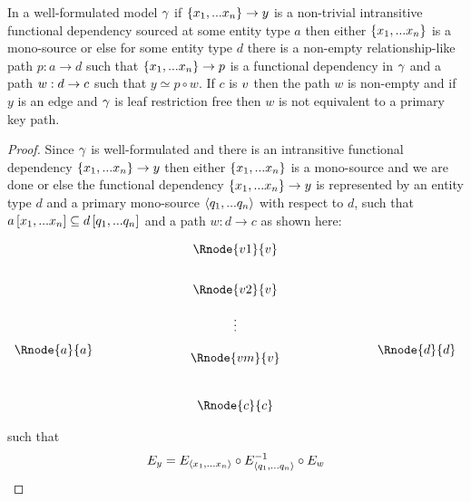 \begin{lemma}
In a well-formulated model $\gamma$  if $\left\{x_1,...x_n\right\} \rightarrow y$  is a non-trivial intransitive 
functional dependency sourced at some entity type $a$ then either $\left\{x_1,...x_n\right\}$ is a mono-source
or else for some entity type $d$ there is a non-empty relationship-like path $p:a \rightarrow d$ such that $\{x_1,...x_n\} \rightarrow p$ is a functional dependency in $\gamma$
and a  path $w:d \rightarrow c$  such that $y \simeq p \circ w$. If $c$ is $v$ then
the path $w$ is non-empty and if $y$ is an edge and $\gamma$ is leaf restriction free then $w$ is not equivalent to a primary key path.
\end{lemma}
\begin{proof}
Since $\gamma$ is well-formulated  and there is an intransitive functional dependency $\left\{x_1,...x_n\right\} \rightarrow y$ then either $\left\{x_1,...x_n\right\}$ is a mono-source and we are done or else the functional dependency
$\left\{x_1,...x_n\right\} \rightarrow y$   is represented 
by  an entity type $d$ and 
a primary mono-source $\langle q_1,...q_n\rangle$ with respect to
$d$, such that $a\left[x_1,...x_n\right]\subseteq d\left[q_1,...q_n\right]$ and a 
path $w:d\rightarrow c$ as shown here:

\setlength{\arraycolsep}{.2cm}
\begin{center}
$
\begin{array}{cp{2cm}c p{2cm} c}
             &  & \Rnode{v1}{\veee} & &               \\ [0.7cm]
						 &  & \Rnode{v2}{\veee} & &               \\ [0.4cm]
						 &  &     \vdots      & &               \\ [0.2cm]
\Rnode{a}{a} &  &                 & & \Rnode{d}{d}  \\ [-0.2cm]
             &  & \Rnode{vm}{\veee} & &               \\ [0.9cm]
             &  & \Rnode{c}{c}    & &               \\
\end{array}
$
\end{center}
such that
\begin{equation}
\label{fundependency}
E_y = E_{\langle x_1,...x_n\rangle} \circ E_{\langle q_1,...q_n\rangle}^{-1} \circ E_w
\end{equation}


\end{proof}
